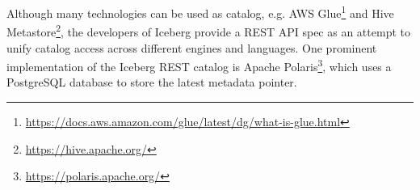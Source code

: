 Although many technologies can be used as catalog, e.g. AWS Glue\footnote{\url{https://docs.aws.amazon.com/glue/latest/dg/what-is-glue.html}} and Hive Metastore\footnote{\url{https://hive.apache.org/}}, the developers of Iceberg provide a REST API spec \cite{apacheicebergRESTCatalogSpec2025} as an attempt to unify catalog access across different engines and languages. One prominent implementation of the Iceberg REST catalog is Apache Polaris\footnote{\url{https://polaris.apache.org/}}, which uses a PostgreSQL database to store the latest metadata pointer. 

    




